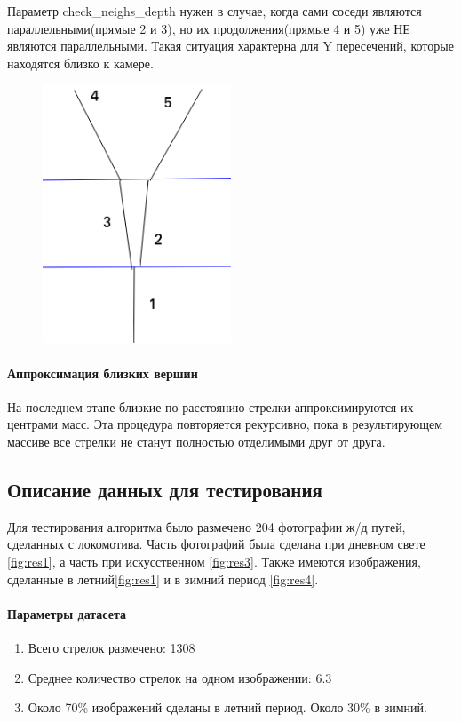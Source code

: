 \newpage
Параметр check\_neighs\_depth нужен в случае, когда сами соседи являются параллельными(прямые 2 и 3), но их продолжения(прямые 4 и 5) уже НЕ являются параллельными. Такая ситуация характерна для Y пересечений, которые находятся близко к камере.
\begin{figure}[!h]
	\centering
	\includegraphics[width=0.5\textwidth, height=0.4\textheight]{pictures/intersection_example1}
	\caption{}
	\label{fig:intersectionexample1}
\end{figure}
\paragraph{Аппроксимация близких вершин}
На последнем этапе близкие по расстоянию стрелки аппроксимируются их центрами масс.
Эта процедура повторяется рекурсивно, пока в результирующем массиве все стрелки не станут полностью отделимыми друг от друга.

\newpage			
\subsection{Описание данных для тестирования}
Для тестирования алгоритма было размечено 204 фотографии ж/д путей, сделанных с локомотива. Часть фотографий была сделана при дневном свете \ref{fig:res1}, а часть при искусственном \ref{fig:res3}. Также имеются изображения, сделанные в летний\ref{fig:res1} и в зимний период \ref{fig:res4}.
\paragraph{Параметры датасета}
\begin{enumerate}
	\item Всего стрелок размечено: 1308
	\item Среднее количество стрелок на одном изображении: 6.3
	\item Около 70\% изображений сделаны в летний период. Около 30\% в зимний.
\end{enumerate}


